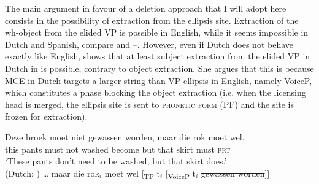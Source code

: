 \documentclass[output=paper,colorlinks,citecolor=brown,
modfonts
]{langscibook}
\begin{document}
\noindent The main argument in favour of a deletion approach that I will adopt here consists in the possibility of extraction from the ellipsis site. Extraction of the wh-object from the elided VP is possible in English, while it seems impossible in Dutch and Spanish, compare  and --. However, even if Dutch does not behave exactly like English, \cite{Aelbrecht2008,Aelbrecht2010} shows that at least subject extraction from the elided VP in Dutch in  is possible, contrary to object extraction. She argues that this is because MCE in Dutch targets a larger string than VP ellipsis in English, namely VoiceP, which constitutes a phase blocking the object extraction (i.e. when the licensing head is merged, the ellipsis site is sent to \textsc{phonetic form} (PF) and the site is frozen for extraction).

\begin{exe}
\ex 
\begin{xlist}
\end{xlist}
\ex  \label{7}
\begin{xlist}
\ex 
\gll Deze broek moet niet gewassen worden, maar die rok moet wel.\\
this pants must not  washed become but that skirt must \textsc{prt} \\
\glt  `These pants don't need to be washed, but that skirt does.' \\ \hfill (Dutch; \citealt{Aelbrecht2010})
\ex 
{\ldots} maar die rok$_{i}$ moet wel [\textsubscript{TP} t$_{i}$ [\textsubscript{VoiceP} t$_{i}$ \sout{gewassen worden}]]
\end{xlist}
\end{exe}
\end{document}
